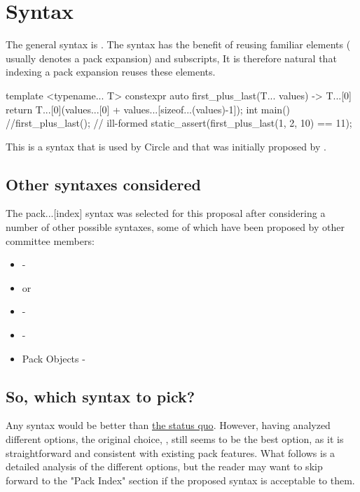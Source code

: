 \documentclass{wg21}
\begin{document}
\section{Syntax}

The general syntax is .
The syntax has the benefit of reusing familiar elements ( usually denotes a pack expansion) and \tcode{[]} subscripts,
It is therefore natural that indexing a pack expansion reuses these elements.

\begin{colorblock}
template <typename... T>
constexpr auto first_plus_last(T... values) ->  T...[0] {
    return T...[0](values...[0] + values...[sizeof...(values)-1]);
}
int main() {
    //first_plus_last(); // ill-formed
    static_assert(first_plus_last(1, 2, 10) == 11);
}
\end{colorblock}

This is a syntax that is used by Circle and that was initially proposed by .

\subsection{Other syntaxes considered}

The pack...[index] syntax was selected for this proposal after considering a
number of other possible syntaxes, some of which have been proposed by other
committee members:

\begin{itemize}
\item {} - 
\item {} or 
\item {} - 
\item {} - 
\item Pack Objects - 
\end{itemize}

\subsection{So, which syntax to pick?}

Any syntax would be better than
\href{https://twitter.com/incomputable/status/1590733659694583808}{the status quo}.
However, having analyzed different options, the original choice,
, still seems to be the best option, as it is straightforward
and consistent with existing pack features.  What follows is a detailed
analysis of the different options, but the reader may want to skip forward to
the "Pack Index" section if the proposed syntax is acceptable to them.
\end{document}
